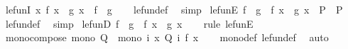 \begin{isabellebody}
\endisatagproof
{\isafoldproof}%
%
\isadelimproof
%
\endisadelimproof
\isanewline
\isanewline
{}\isamarkupfalse%
\isanewline
\isanewline
{}\isamarkupfalse%
\ le{\isacharunderscore}{\kern0pt}funI{\isacharcolon}{\kern0pt}\ {\isachardoublequoteopen}{\isacharparenleft}{\kern0pt}{\isasymAnd}x{\isachardot}{\kern0pt}\ f\ x\ {\isasymle}\ g\ x{\isacharparenright}{\kern0pt}\ {\isasymLongrightarrow}\ f\ {\isasymle}\ g{\isachardoublequoteclose}\isanewline
%
\isadelimproof
\ \ %
\endisadelimproof
%
\isatagproof
{}\isamarkupfalse%
\ le{\isacharunderscore}{\kern0pt}fun{\isacharunderscore}{\kern0pt}def\ \isamarkupfalse%
\ simp%
\endisatagproof
{\isafoldproof}%
%
\isadelimproof
\isanewline
%
\endisadelimproof
\isanewline
{}\isamarkupfalse%
\ le{\isacharunderscore}{\kern0pt}funE{\isacharcolon}{\kern0pt}\ {\isachardoublequoteopen}f\ {\isasymle}\ g\ {\isasymLongrightarrow}\ {\isacharparenleft}{\kern0pt}f\ x\ {\isasymle}\ g\ x\ {\isasymLongrightarrow}\ P{\isacharparenright}{\kern0pt}\ {\isasymLongrightarrow}\ P{\isachardoublequoteclose}\isanewline
%
\isadelimproof
\ \ %
\endisadelimproof
%
\isatagproof
{}\isamarkupfalse%
\ le{\isacharunderscore}{\kern0pt}fun{\isacharunderscore}{\kern0pt}def\ \isamarkupfalse%
\ simp%
\endisatagproof
{\isafoldproof}%
%
\isadelimproof
\isanewline
%
\endisadelimproof
\isanewline
{}\isamarkupfalse%
\ le{\isacharunderscore}{\kern0pt}funD{\isacharcolon}{\kern0pt}\ {\isachardoublequoteopen}f\ {\isasymle}\ g\ {\isasymLongrightarrow}\ f\ x\ {\isasymle}\ g\ x{\isachardoublequoteclose}\isanewline
%
\isadelimproof
\ \ %
\endisadelimproof
%
\isatagproof
{}\isamarkupfalse%
\ {\isacharparenleft}{\kern0pt}rule\ le{\isacharunderscore}{\kern0pt}funE{\isacharparenright}{\kern0pt}%
\endisatagproof
{\isafoldproof}%
%
\isadelimproof
\isanewline
%
\endisadelimproof
\isanewline
{}\isamarkupfalse%
\ mono{\isacharunderscore}{\kern0pt}compose{\isacharcolon}{\kern0pt}\ {\isachardoublequoteopen}mono\ Q\ {\isasymLongrightarrow}\ mono\ {\isacharparenleft}{\kern0pt}{\isasymlambda}i\ x{\isachardot}{\kern0pt}\ Q\ i\ {\isacharparenleft}{\kern0pt}f\ x{\isacharparenright}{\kern0pt}{\isacharparenright}{\kern0pt}{\isachardoublequoteclose}\isanewline
%
\isadelimproof
\ \ %
\endisadelimproof
%
\isatagproof
{}\isamarkupfalse%
\ mono{\isacharunderscore}{\kern0pt}def\ le{\isacharunderscore}{\kern0pt}fun{\isacharunderscore}{\kern0pt}def\ \isamarkupfalse%
\ auto%
\endisatagproof
{\isafoldproof}%

\end{isabellebody}
